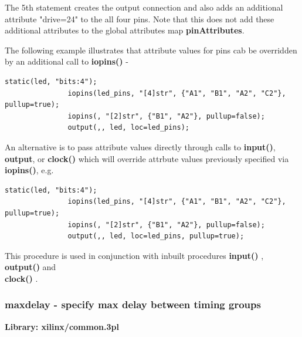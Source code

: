             The 5th statement creates the output connection and also adds an
            additional attribute "drive=24" to the all four pins. Note that this
            does not add these additional attributes to the global attributes map
             {\bf pinAttributes}.
                        
            The following example illustrates that attribute values for pins
            cab be overridden by an additional call to {\bf iopins()} -
            \begin{lstlisting}[gobble=12, language=threepl]
               static(led, "bits:4");
               iopins(led_pins, "[4]str", {"A1", "B1", "A2", "C2"}, pullup=true);
               iopins(, "[2]str", {"B1", "A2"}, pullup=false);
               output(,, led, loc=led_pins);
            \end{lstlisting}
            
            An alternative is to pass attribute values directly through calls to
            {\bf input()}, {\bf output}, or {\bf clock()} which will override
            attrbute values previously specified via {\bf iopins()}, e.g.
            \begin{lstlisting}[gobble=12, language=threepl]
               static(led, "bits:4");
               iopins(led_pins, "[4]str", {"A1", "B1", "A2", "C2"}, pullup=true);
               iopins(, "[2]str", {"B1", "A2"}, pullup=false);
               output(,, led, loc=led_pins, pullup=true);
            \end{lstlisting}
            
            
            This procedure is used in conjunction with inbuilt procedures
            {\bf input()} , \\
            {\bf output()}  and \\
            {\bf clock()} .









        \subsubsection{maxdelay - specify max delay between timing groups}\label{sec:lpmaxdelay}
            
            {\bf Library: xilinx/common.3pl}

